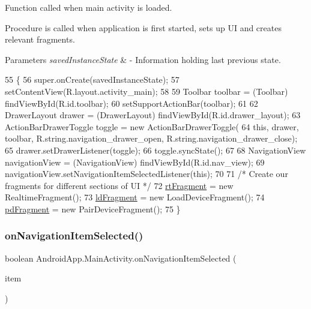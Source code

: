 Function called when main activity is loaded. 

Procedure is called when application is first started, sets up UI and creates relevant fragments.


\begin{DoxyParams}{Parameters}
{\em saved\+Instance\+State} & -\/ Information holding last previous state. \\
\hline
\end{DoxyParams}

\begin{DoxyCode}
55                                                        \{
56         super.onCreate(savedInstanceState);
57         setContentView(R.layout.activity\_main);
58 
59         Toolbar toolbar = (Toolbar) findViewById(R.id.toolbar);
60         setSupportActionBar(toolbar);
61 
62         DrawerLayout drawer = (DrawerLayout) findViewById(R.id.drawer\_layout);
63         ActionBarDrawerToggle toggle = \textcolor{keyword}{new} ActionBarDrawerToggle(
64                 \textcolor{keyword}{this}, drawer, toolbar, R.string.navigation\_drawer\_open, R.string.navigation\_drawer\_close);
65         drawer.setDrawerListener(toggle);
66         toggle.syncState();
67 
68         NavigationView navigationView = (NavigationView) findViewById(R.id.nav\_view);
69         navigationView.setNavigationItemSelectedListener(\textcolor{keyword}{this});
70 
71         \textcolor{comment}{/* Create our fragments for different sections of UI */}
72         \hyperlink{class_android_app_1_1_main_activity_ad0c2b20cf0204ef3b8ad00596870e9a1}{rtFragment} = \textcolor{keyword}{new} RealtimeFragment();
73         \hyperlink{class_android_app_1_1_main_activity_ad54c7414ab4cb86c81e79f2f0037c694}{ldFragment} = \textcolor{keyword}{new} LoadDeviceFragment();
74         \hyperlink{class_android_app_1_1_main_activity_a6dea684256a0cd0f73f87546ec2b0de2}{pdFragment} = \textcolor{keyword}{new} PairDeviceFragment();
75     \}
\end{DoxyCode}
\mbox{\label{class_android_app_1_1_main_activity_a260151867f535b62a2a926c270a2dbb8}} 
\subsubsection{\texorpdfstring{on\+Navigation\+Item\+Selected()}{onNavigationItemSelected()}}
{\footnotesize\ttfamily boolean Android\+App.\+Main\+Activity.\+on\+Navigation\+Item\+Selected (\begin{DoxyParamCaption}\item[{Menu\+Item}]{item }\end{DoxyParamCaption})\hspace{0.3cm}{\ttfamily [inline]}}



